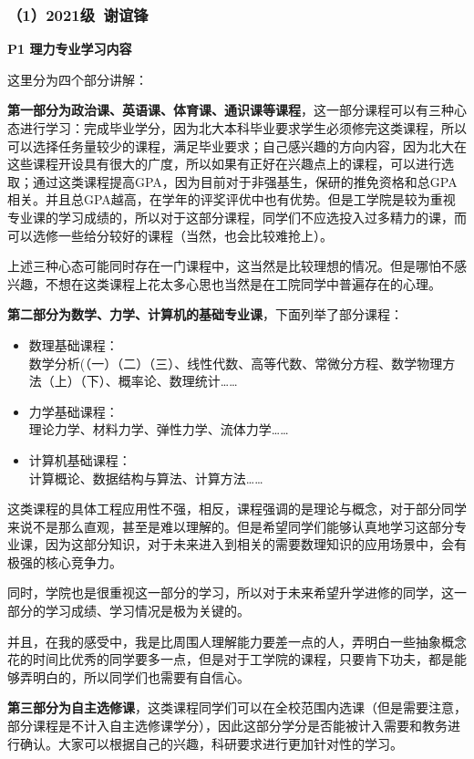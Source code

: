 \documentclass[11pt,oneside]{book}
\begin{document}
\subsubsection{（1）2021级\ 谢谊锋}
\textbf{P1 理力专业学习内容}

这里分为四个部分讲解：

\textbf{第一部分为政治课、英语课、体育课、通识课等课程}，这一部分课程可以有三种心态进行学习：完成毕业学分，因为北大本科毕业要求学生必须修完这类课程，所以可以选择任务量较少的课程，满足毕业要求；自己感兴趣的方向内容，因为北大在这些课程开设具有很大的广度，所以如果有正好在兴趣点上的课程，可以进行选取；通过这类课程提高GPA，因为目前对于非强基生，保研的推免资格和总GPA相关。并且总GPA越高，在学年的评奖评优中也有优势。但是工学院是较为重视专业课的学习成绩的，所以对于这部分课程，同学们不应选投入过多精力的课，而可以选修一些给分较好的课程（当然，也会比较难抢上）。

上述三种心态可能同时存在一门课程中，这当然是比较理想的情况。但是哪怕不感兴趣，不想在这类课程上花太多心思也当然是在工院同学中普遍存在的心理。
 
\textbf{第二部分为数学、力学、计算机的基础专业课}，下面列举了部分课程：
\begin{itemize}
    \item 数理基础课程：\\数学分析(（一）（二）（三）、线性代数、高等代数、常微分方程、数学物理方法（上）（下）、概率论、数理统计……
    \item 力学基础课程：\\理论力学、材料力学、弹性力学、流体力学……
    \item 计算机基础课程：\\计算概论、数据结构与算法、计算方法……
\end{itemize}

这类课程的具体工程应用性不强，相反，课程强调的是理论与概念，对于部分同学来说不是那么直观，甚至是难以理解的。但是希望同学们能够认真地学习这部分专业课，因为这部分知识，对于未来进入到相关的需要数理知识的应用场景中，会有极强的核心竞争力。

同时，学院也是很重视这一部分的学习，所以对于未来希望升学进修的同学，这一部分的学习成绩、学习情况是极为关键的。

并且，在我的感受中，我是比周围人理解能力要差一点的人，弄明白一些抽象概念花的时间比优秀的同学要多一点，但是对于工学院的课程，只要肯下功夫，都是能够弄明白的，所以同学们也需要有自信心。

\textbf{第三部分为自主选修课}，这类课程同学们可以在全校范围内选课（但是需要注意，部分课程是不计入自主选修课学分），因此这部分学分是否能被计入需要和教务进行确认。大家可以根据自己的兴趣，科研要求进行更加针对性的学习。
\end{document}
